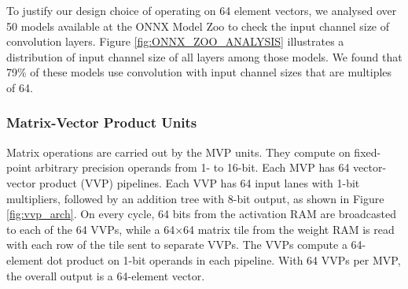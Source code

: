 \documentclass[sigconf]{acmart}
\begin{document}
To justify our design choice of operating on 64 element vectors, we analysed over 50 models available at the ONNX Model Zoo \cite{onnx_zoo} to check the input channel size of convolution layers. Figure \ref{fig:ONNX_ZOO_ANALYSIS} illustrates a distribution of input channel size of all layers among those models. We found that 79\% of these models use convolution with input channel sizes that are multiples of 64. 


\subsubsection{Matrix-Vector Product Units}

Matrix operations are carried out by the MVP units. They compute on fixed-point arbitrary precision operands from 1- to 16-bit. Each MVP has 64 vector-vector product (VVP) pipelines. Each VVP has 64 input lanes with 1-bit multipliers, followed by an addition tree with 8-bit output, as shown in Figure \ref{fig:vvp_arch}. 
On every cycle, 64 bits from the activation RAM are broadcasted to each of the 64 VVPs, while a 64$\times$64 matrix tile from the weight RAM is read with each row of the tile sent to separate VVPs. The VVPs compute a 64-element dot product on 1-bit operands in each pipeline. With 64 VVPs per MVP, the overall output is a 64-element vector. 

\end{document}

